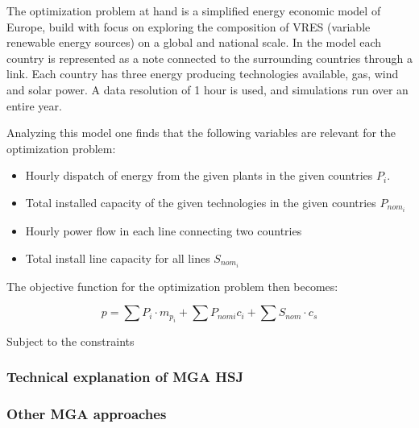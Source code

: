 The optimization problem at hand is a simplified energy economic model of Europe, build with focus on exploring the composition of VRES (variable renewable energy sources) on a global and national scale. In the model each country is represented as a note connected to the surrounding countries through a link. Each country has three energy producing technologies available, gas, wind and solar power. A data resolution of 1 hour is used, and simulations run over an entire year. 

Analyzing this model one finds that the following variables are relevant for the optimization problem:

\begin{itemize}
    \item Hourly dispatch of energy from the given plants in the given countries $P_i$.
    \item Total installed capacity of the given technologies in the given countries $P_{nom_i}$
    \item Hourly power flow in each line connecting two countries
    \item Total install line capacity for all lines $S_{nom_i}$

\end{itemize}

The objective function for the optimization problem then becomes: 

\begin{equation}
    p = \sum P_i \cdot m_{p_i} + \sum P_{nom i} c_i + \sum S_{nom} \cdot c_s 
\end{equation}{}

Subject to the constraints 


\subsubsection{Technical explanation of MGA HSJ}

\subsubsection{Other MGA approaches}